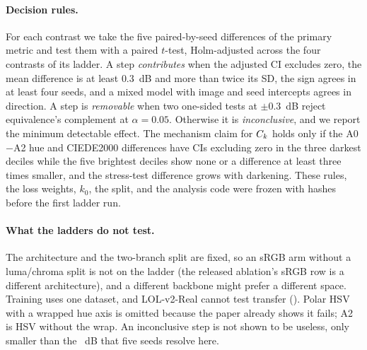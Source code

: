 \paragraph{Decision rules.} For each contrast we take the five paired-by-seed differences of
the primary metric and test them with a paired $t$-test, Holm-adjusted across the four
contrasts of its ladder. A step \emph{contributes} when the adjusted CI excludes zero, the
mean difference is at least $0.3$~dB and more than twice its SD, the sign agrees in at least
four seeds, and a mixed model with image and seed intercepts agrees in direction. A step is
\emph{removable} when two one-sided tests at $\pm 0.3$~dB reject equivalence's complement at
$\alpha = 0.05$. Otherwise it is \emph{inconclusive}, and we report the minimum detectable
effect. The mechanism claim for $C_k$ holds only if the A0$-$A2 hue and CIEDE2000
differences have CIs excluding zero in the three darkest deciles while the five brightest
deciles show none or a difference at least three times smaller, and the stress-test
difference grows with darkening. These rules, the loss weights, $k_0$, the split, and the
analysis code were frozen with hashes before the first ladder run.

\paragraph{What the ladders do not test.} The architecture and the two-branch split are
fixed, so an sRGB arm without a luma/chroma split is not on the ladder (the released
ablation's sRGB row is a different architecture), and a different backbone might prefer a
different space. Training uses one dataset, and LOL-v2-Real cannot test transfer
(). Polar HSV
with a wrapped hue axis is omitted because the paper already shows it fails; A2 is HSV
without the wrap. An inconclusive step is not shown to be useless, only smaller than the
~dB that five seeds resolve here.
